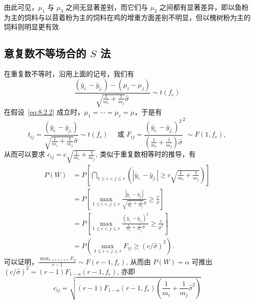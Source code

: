 由此可见，$\mu_1$ 与 $\mu_3$ 之间无显著差别，而它们与 $\mu_2$ 之间都有显著差异，即以鱼粉为主的饲料与以苜着粉为主的饲料在鸡的增重方面差别不明显，但以槐树粉为主的饲料则明显更有效.

\subsection{意复数不等场合的 $S$ 法}

在重复数不等时，沿用上面的记号，我们有
\begin{equation*}
  \frac{(\bar{y}_{i.} - \bar{y}_{j.}) - (\mu_i - \mu_j)}{\sqrt{\frac{1}{m_i}+\frac{1}{m_j}}\hat{\sigma}} \sim t(f_e)
\end{equation*}
在假设~\eqref{eq:8.2.2} 成立时，$\mu_1 = \cdots = \mu_r = \mu$，于是有
\begin{equation*}
  t_{ij} =   \frac{(\bar{y}_{i.} - \bar{y}_{j.})}{\sqrt{\frac{1}{m_i}+\frac{1}{m_j}}\hat{\sigma}} \sim t(f_e) \quad \text{ 或 } F_{ij} = \frac{(\bar{y}_{i.} - \bar{y}_{j.})^2}{\left(\frac{1}{m_i}+\frac{1}{m_j}\right)\hat{\sigma}}^2 \sim F(1, f_e),
\end{equation*}
从而可以要求 $c_{ij} = c \sqrt{\frac{1}{m_i}+\frac{1}{m_j}}$, 类似于重复数相等时的推导，有
\begin{align*}
  P(W) & = P \left[\bigcap_{1\leq i < j \leq r} \left(|\bar{y}_{i.} - \bar{y}_{j.}| \geq c \sqrt{\frac{1}{m_i}+\frac{1}{m_j}}\right)\right] \\
       & = P \left[\max_{1 \leq i < j \leq r} \frac{|\bar{y}_{i.} - \bar{y}_{j.}|}{\sqrt{\frac{1}{m_i}+\frac{1}{m_j}}\hat{\sigma}} \geq \frac{c}{\hat{\sigma}}\right] \\
       & = P \left[\max_{1 \leq i < j \leq r} \frac{(\bar{y}_{i.} - \bar{y}_{j.})^2}{\frac{1}{m_i}+\frac{1}{m_j}\hat{\sigma}} \geq \frac{c}{\hat{\sigma}^2}\right] \\
       & = P(\max_{1\leq i < j \leq r} F_{ij} \geq (c/\hat{\sigma})^2).
\end{align*}
可以证明，$\frac{\max_{1\leq i < j \leq r} F_{ij}}{r-1} \sim F(r-1, f_e)$, 从而由 $P(W)=\alpha$ 可推出 $(c/\hat{\sigma})^2 = (r-1) F_{1-\alpha} (r-1, f_e)$, 亦即
\begin{equation*}
  c_{ij} = \sqrt{(r-1) F_{1-\alpha}(r-1, f_e) \left(\frac{1}{m_i} + \frac{1}{m_j} \hat{\sigma}^2\right)}
\end{equation*}

